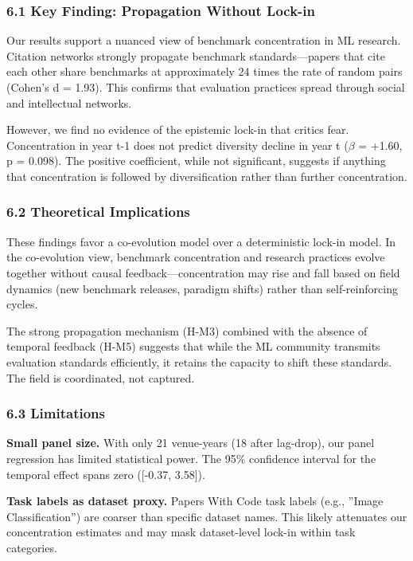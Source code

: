 
\subsubsection{6.1 Key Finding: Propagation Without Lock-in}

Our results support a nuanced view of benchmark concentration in ML research. Citation networks strongly propagate benchmark standards---papers that cite each other share benchmarks at approximately 24 times the rate of random pairs (Cohen's d = 1.93). This confirms that evaluation practices spread through social and intellectual networks.

However, we find no evidence of the epistemic lock-in that critics fear. Concentration in year t-1 does not predict diversity decline in year t ($\beta$ = +1.60, p = 0.098). The positive coefficient, while not significant, suggests if anything that concentration is followed by diversification rather than further concentration.

\subsubsection{6.2 Theoretical Implications}

These findings favor a co-evolution model over a deterministic lock-in model. In the co-evolution view, benchmark concentration and research practices evolve together without causal feedback---concentration may rise and fall based on field dynamics (new benchmark releases, paradigm shifts) rather than self-reinforcing cycles.

The strong propagation mechanism (H-M3) combined with the absence of temporal feedback (H-M5) suggests that while the ML community transmits evaluation standards efficiently, it retains the capacity to shift these standards. The field is coordinated, not captured.

\subsubsection{6.3 Limitations}

\textbf{Small panel size.} With only 21 venue-years (18 after lag-drop), our panel regression has limited statistical power. The 95\% confidence interval for the temporal effect spans zero ([-0.37, 3.58]).

\textbf{Task labels as dataset proxy.} Papers With Code task labels (e.g., ''Image Classification'') are coarser than specific dataset names. This likely attenuates our concentration estimates and may mask dataset-level lock-in within task categories.

